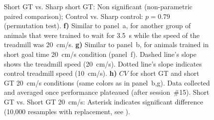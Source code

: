 \begin{figure}[bt!]
\begin{center}
{    Short GT vs. Sharp short GT: Non significant (non-parametric paired comparison); 
    Control vs. Sharp control: $p=0.79$ (permutation test).
    \textbf{f)}
    Similar to panel~a, for another group of animals that were trained to wait for 3.5~s while the speed of the treadmill was 20~cm/s.
    \textbf{g)}
    Similar to panel~b, for animals trained in short goal time 20~cm/s condition (panel~f).
    Dashed line's slope shows the treadmill speed (20~cm/s).
    Dotted line's slope indicates control treadmill speed (10~cm/s).
    \textbf{h)}
    $CV$ for short GT and short GT 20~cm/s conditions (same colors as in panel~b,g).
    Data collected and averaged once performance plateaued (after session~\#15).
    Short GT vs. Short GT 20~cm/s: Asterisk indicates significant difference (10,000 resamples with replacement, see ).
    }
    \label{fig:time:shortSharp}
  \end{center}
\end{figure}
